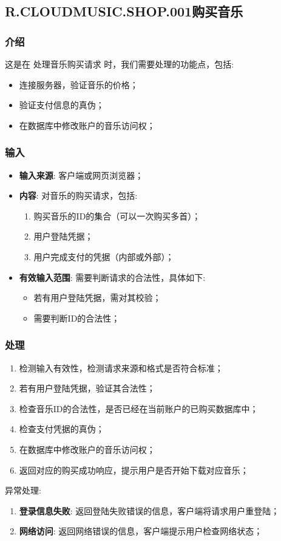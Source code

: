 \subsection{R.CLOUDMUSIC.SHOP.001购买音乐}
\subsubsection{介绍}
	这是在 处理音乐购买请求 时，我们需要处理的功能点，包括: 
	\begin{itemize}
		\item 连接服务器，验证音乐的价格；
		\item 验证支付信息的真伪；
		\item 在数据库中修改账户的音乐访问权；
	\end{itemize}
\subsubsection{输入}
	\begin{itemize}
		\item \textbf{输入来源}: 客户端或网页浏览器；
		\item \textbf{内容}: 对音乐的购买请求，包括: 
		\begin{enumerate}
			\item 购买音乐的ID的集合（可以一次购买多首）；
			\item 用户登陆凭据；
			\item 用户完成支付的凭据（内部或外部）；
		\end{enumerate}
		\item \textbf{有效输入范围}: 需要判断请求的合法性，具体如下: 
		\begin{itemize}
			\item 若有用户登陆凭据，需对其校验； 
			\item 需要判断ID的合法性；
		\end{itemize}
	\end{itemize}
\subsubsection{处理}
	\begin{enumerate}
		\item 检测输入有效性，检测请求来源和格式是否符合标准；
		\item 若有用户登陆凭据，验证其合法性；
		\item 检查音乐ID的合法性，是否已经在当前账户的已购买数据库中；
		\item 检查支付凭据的真伪；
		\item 在数据库中修改账户的音乐访问权；
		\item 返回对应的购买成功响应，提示用户是否开始下载对应音乐；
	\end{enumerate}
	\noindent 异常处理: 
	\begin{enumerate}
		\item \textbf{登录信息失败}: 返回登陆失败错误的信息，客户端将请求用户重登陆；
		\item \textbf{网络访问}: 返回网络错误的信息，客户端提示用户检查网络状态；
	\end{enumerate}
